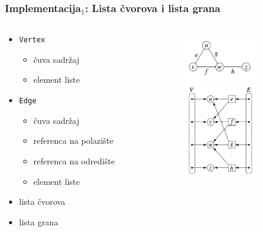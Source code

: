 \documentclass[compress,aspectratio=169]{beamer}
\begin{document}
\begin{frame}[fragile]
  \frametitle{Implementacija$_1$: Lista čvorova i lista grana}
  \begin{columns}
    \begin{column}[t]{6cm}
      \begin{itemize}
        \item \texttt{Vertex}
        \begin{itemize}
          \item čuva sadržaj
          \item element liste
        \end{itemize}
        \item \texttt{Edge}
        \begin{itemize}
          \item čuva sadržaj
          \item referenca na polazište
          \item referenca na odredište
          \item element liste
        \end{itemize}
        \item lista čvorova
        \item lista grana
      \end{itemize}
    \end{column}
    \begin{column}[t]{6cm}
      \begin{center}
        \includegraphics[width=3.5cm]{asp-14-pic08.png} \\
        \includegraphics[width=3.5cm]{asp-14-pic09.png}
      \end{center}
    \end{column}
  \end{columns}
\end{frame}
\end{document}
